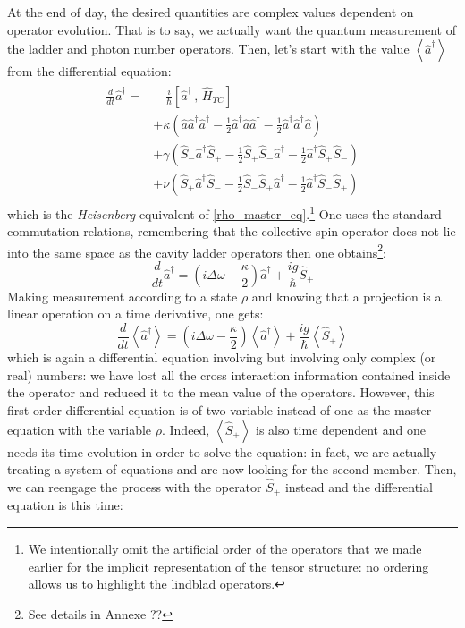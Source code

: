 \documentclass[12pt]{report}
\begin{document}
At the end of day, the desired quantities are complex values dependent on operator evolution. That is to say, we actually want the quantum measurement of the ladder and photon number operators. Then, let's start with the value $\left\langle\hat{a}^\dagger\right\rangle$ from the differential equation:
\begin{align}
\begin{split}
\frac{d}{dt}\hat{a}^\dagger = &\quad\frac{i}{\hbar}\left[ \hat{a}^\dagger \, , \,\hat{H}_{TC} \right]\\
&+ \kappa \left( \hat{a} \hat{a}^\dagger \hat{a}^\dagger - \frac{1}{2} \hat{a}^\dagger \hat{a} \hat{a}^\dagger - \frac{1}{2} \hat{a}^\dagger \hat{a}^\dagger \hat{a} \right)\\
&+ \gamma \left( \hat{S}_- \hat{a}^\dagger \hat{S}_+ - \frac{1}{2} \hat{S}_+ \hat{S}_- \hat{a}^\dagger - \frac{1}{2} \hat{a}^\dagger \hat{S}_+ \hat{S}_- \right)\\
&+ \nu \left( \hat{S}_+ \hat{a}^\dagger \hat{S}_- - \frac{1}{2} \hat{S}_- \hat{S}_+ \hat{a}^\dagger - \frac{1}{2} \hat{a}^\dagger \hat{S}_- \hat{S}_+ \right)
\end{split}
\end{align}
which is the \textit{Heisenberg} equivalent of \eqref{rho_master_eq}.\footnote{We intentionally omit the artificial order of the operators that we made earlier for the implicit representation of the tensor structure: no ordering allows us to highlight the lindblad operators.} One uses the standard commutation relations, remembering that the collective spin operator does not lie into the same space as the cavity ladder operators then one obtains\footnote{See details in Annexe ??}:
\begin{equation}
\label{ad_pure}
\frac{d}{dt}\hat{a}^\dagger = \left(i\Delta\omega - \frac{\kappa}{2} \right) \hat{a}^\dagger + \frac{ig}{\hbar} \hat{S}_+
\end{equation}
Making measurement according to a state $\rho$ and knowing that a projection is a linear operation on a time derivative, one gets:
\begin{equation}
\label{ad_mean_field}
\frac{d}{dt}\left\langle\hat{a}^\dagger\right\rangle = \left(i\Delta\omega - \frac{\kappa}{2} \right) \left\langle\hat{a}^\dagger\right\rangle + \frac{ig}{\hbar} \left\langle\hat{S}_+\right\rangle
\end{equation}
which is again a differential equation involving but involving only complex (or real) numbers: we have lost all the cross interaction information contained inside the operator and reduced it to the mean value of the operators. However, this first order differential equation is of two variable instead of one as the master equation with the variable $\rho$. Indeed, $\left\langle\hat{S}_+\right\rangle$ is also time dependent and one needs its time evolution in order to solve the equation: in fact, we are actually treating a system of equations and are now looking for the second member. Then, we can reengage the process with the operator $\hat{S}_+$ instead and the differential equation is this time:
\end{document}
